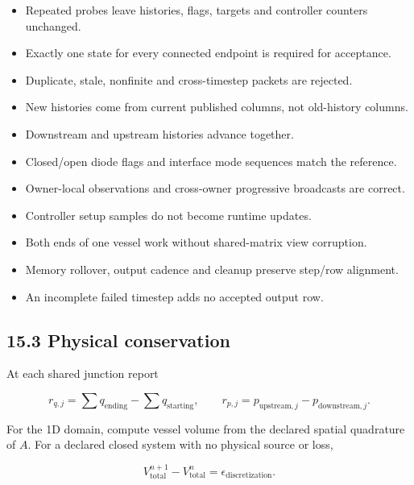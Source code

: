\documentclass[11pt,a4paper]{article}
\begin{document}
\begin{itemize}
\item Repeated probes leave histories, flags, targets and controller counters unchanged.


\item Exactly one state for every connected endpoint is required for acceptance.


\item Duplicate, stale, nonfinite and cross-timestep packets are rejected.


\item New histories come from current published columns, not old-history columns.


\item Downstream and upstream histories advance together.


\item Closed/open diode flags and interface mode sequences match the reference.


\item Owner-local observations and cross-owner progressive broadcasts are correct.


\item Controller setup samples do not become runtime updates.


\item Both ends of one vessel work without shared-matrix view corruption.


\item Memory rollover, output cadence and cleanup preserve step/row alignment.


\item An incomplete failed timestep adds no accepted output row.


\end{itemize}
\subsection{15.3 Physical conservation}
At each shared junction report


\nopagebreak[3]
\[
r_{q,j}=\sum q_{\mathrm{ending}}-\sum q_{\mathrm{starting}},
\qquad r_{p,j}=p_{\mathrm{upstream},j}-p_{\mathrm{downstream},j}.
\]


For the 1D domain, compute vessel volume from the declared spatial quadrature of \(A\). For a declared closed system with no physical source or loss,


\nopagebreak[3]
\[
V_{\mathrm{total}}^{n+1}-V_{\mathrm{total}}^n
=\epsilon_{\mathrm{discretization}}.
\]
\end{document}
